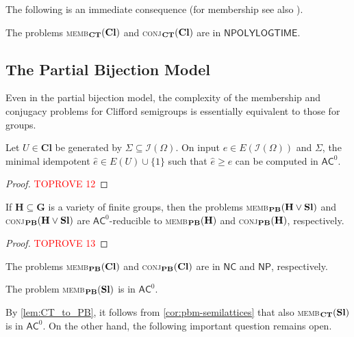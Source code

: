 \documentclass[anonymous,letter,UKenglish,cleveref,autoref,thm-restate]{lipics-v2021}
\renewcommand{\geq}{\geqslant}
\newcommand{\sse}{\subseteq}
\newcommand{\NPOLYLOGTIME}{\ensuremath{\mathsf{NPOLYLOGTIME}}\xspace}
\newcommand{\ACz}{\ensuremath{\mathsf{AC}^0}\xspace}
\newcommand{\NC}{\ensuremath{\mathsf{NC}}\xspace}
\newcommand{\NP}{\ensuremath{\mathsf{NP}}\xspace}
\newcommand{\vH}{\ensuremath{\mathbf{H}}}
\newcommand{\vG}{\ensuremath{\mathbf{G}}}
\newcommand{\vSl}{\ensuremath{\mathbf{Sl}}}
\newcommand{\vCl}{\ensuremath{\mathbf{Cl}}}
\newcommand{\ISym}{\cI}
\newcommand{\cI}{\mathcal{I}}
\theoremstyle{plain}
\theoremstyle{plain}
\newcommand{\dMemb}[2][]{\textup{\textsc{memb${}_{\mathbf{#1}}\expandafter\ifx\expandafter\relax\detokenize{#2}\relax\else(#2)\fi$}}}
\newcommand{\dConj}[2][]{\textup{\textsc{conj${}_{\mathbf{#1}}\expandafter\ifx\expandafter\relax\detokenize{#2}\relax\else(#2)\fi$}}}
\begin{document}
The following is an immediate consequence (for membership see also \cite{Fleischer19diss}).

\begin{proposition}\label{pro:ctm-clifford}
  The problems \dMemb[CT]{\vCl} and \dConj[CT]{\vCl} are in \NPOLYLOGTIME{}.
\end{proposition}


\subsection{The Partial Bijection Model}\label{sub:clifford-pb}

Even in the partial bijection model, the complexity of the membership and conjugacy problems for Clifford semigroups is essentially equivalent to those for groups.

\begin{lemma}\label{lem:clifford-idempotent_cover}
  Let $U \in \vCl$ be generated by $\Sigma \sse \ISym(\Omega)$.
	On input $e \in E(\ISym(\Omega))$ and $\Sigma$, the minimal idempotent $\hat e \in E(U) \cup \{ 1 \}$ such that $\hat e \geq e$ can be computed in $\ACz$.
\end{lemma}
\begin{proof}\textcolor{red}{TOPROVE 12}\end{proof}

\begin{proposition}\label{pro:pbm-clifford}
  If $\vH \sse \vG$ is a variety of finite groups, then the problems \dMemb[PB]{\vH\vee\vSl} and \dConj[PB]{\vH\vee\vSl} are $\ACz$-reducible to \dMemb[PB]{\vH} and \dConj[PB]{\vH}, respectively.
\end{proposition}

\begin{proof}\textcolor{red}{TOPROVE 13}\end{proof}

\begin{corollary}\label{cor:pbm-clifford-groups}
  The problems \dMemb[PB]{\vCl} and \dConj[PB]{\vCl} are in \NC and \NP, respectively.
\end{corollary}
\begin{corollary}\label{cor:pbm-semilattices}
  The problem \dMemb[PB]{\vSl} is in \ACz.
\end{corollary}

By \cref{lem:CT_to_PB}, it follows from \cref{cor:pbm-semilattices} that also \dMemb[CT]{\vSl} is in \ACz. On the other hand, the following important question remains open.
\end{document}

